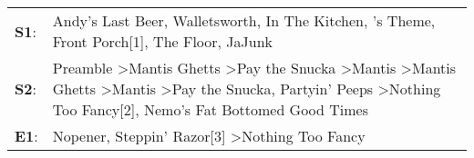 \begin{supertabular}{p{0.03\textwidth}p{0.92\textwidth}}
 \textbf{S1}:  &                                                                                                                                                                                                                                      Andy's Last Beer\textsuperscript{}, \enspace Walletsworth\textsuperscript{}, \enspace In The Kitchen\textsuperscript{}, 's Theme\textsuperscript{}, \enspace Front Porch[1]\textsuperscript{}, \enspace The Floor\textsuperscript{}, \enspace JaJunk\textsuperscript{}  \enspace  \\
 \textbf{S2}:  &  Preamble\textsuperscript{} \textgreater \enspace Mantis Ghetts\textsuperscript{} \textgreater \enspace Pay the Snucka\textsuperscript{} \textgreater \enspace Mantis\textsuperscript{} \textgreater \enspace Mantis Ghetts\textsuperscript{} \textgreater \enspace Mantis\textsuperscript{} \textgreater \enspace Pay the Snucka\textsuperscript{}, \enspace Partyin' Peeps\textsuperscript{} \textgreater \enspace Nothing Too Fancy[2]\textsuperscript{}, \enspace Nemo's Fat Bottomed Good Times\textsuperscript{}  \enspace  \\
 \textbf{E1}:  &                                                                                                                                                                                                                                                                                                                                                                                      Nopener\textsuperscript{}, \enspace Steppin' Razor[3]\textsuperscript{} \textgreater \enspace Nothing Too Fancy\textsuperscript{}  \enspace  \\
\end{supertabular}
